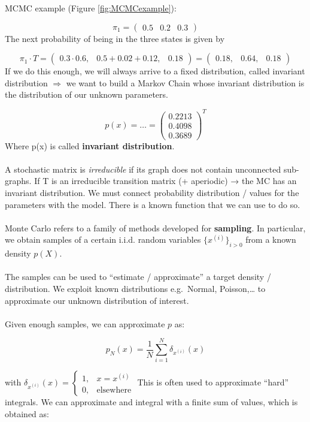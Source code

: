 MCMC example (Figure \ref{fig:MCMCexample}):

$$
\pi_1=\begin{pmatrix}0.5 & 0.2& 0.3 \end{pmatrix}
$$
\noindent
The next probability of being in the three states is given by

$$
\pi_1 \cdot T=\begin{pmatrix}0.3\cdot0.6, & 0.5+0.02+0.12,& 0.18 \end{pmatrix} = \begin{pmatrix}0.18, & 0.64,& 0.18 \end{pmatrix}
$$
\noindent
If we do this enough, we will always arrive to a fixed distribution,
called invariant distribution $\Rightarrow$ we want to build a Markov
Chain whose invariant distribution is the distribution of our unknown
parameters.

$$
p(x)=\dots = \begin{pmatrix} 0.2213 \\ 0.4098 \\ 0.3689\end{pmatrix}^T
$$
Where p(x) is called \textbf{invariant distribution}.
\\
\\
\noindent
A stochastic matrix is \emph{irreducible} if its graph does not contain
unconnected sub-graphs. If T is an irreducible transition matrix (+ aperiodic) → the MC has an
invariant distribution.
\noindent
We must connect probability distribution / values for the parameters
with the model. There is a known function that we can use to do so.
\\
\\
\noindent
Monte Carlo refers to a family of methods developed for
\textbf{sampling}. In particular, we obtain samples of a certain i.i.d.
random variables $\{x^{(i)}\}_{i>0}$ from a known density $p(X)$.
\\
\\
\noindent
The samples can be used to ``estimate / approximate'' a target density /
distribution. We exploit known distributions e.g.~Normal,
Poisson,\ldots{} to approximate our unknown distribution of interest.
\\
\\
\noindent
Given enough samples, we can approximate $p$ as:

$$
p_N(x)= \frac{1}{N}\sum^N_{i=1}\delta_{x^{(i)}}(x)
$$

with
$\delta_{x^{(i)}}(x)= \begin{cases}1, & x=x^{(i)} \\ 0, & \text{elsewhere}\end{cases}$
\noindent
This is often used to approximate ``hard'' integrals. We can approximate
and integral with a finite sum of values, which is obtained as:

